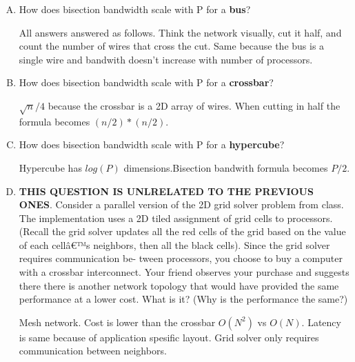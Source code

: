 \documentclass[11pt]{article}
\newenvironment{choice}{\begin{enumerate}[A.]}{\end{enumerate}}
\newenvironment{answer}{\begin{minipage}[c][1.5in]{\textwidth}}{\end{minipage}}
\begin{document}
\begin{choice}

\item How does bisection bandwidth scale with P for a \textbf{bus}?

\begin{answer}
All answers answered as follows. Think the network visually, cut it half,
and count the number of wires that cross the cut.\newline
Same because the bus is a single wire and bandwith doesn't increase with number of processors.
\end{answer}
\item How does bisection bandwidth scale with P for a \textbf{crossbar}?

\begin{answer}
$\sqrt{n}/4$ because the crossbar is a 2D array of wires. 
When cutting in half the formula becomes $(n/2) * (n/2)$.
\end{answer}
\item How does bisection bandwidth scale with P for a \textbf{hypercube}?

\begin{answer}
Hypercube has $log(P)$ dimensions.Bisection bandwith formula becomes $P/2$.
\end{answer}
\newpage 
\item \textbf{THIS QUESTION IS UNLRELATED TO THE PREVIOUS ONES}. Consider a parallel version of the 2D grid solver problem from class. The implementation uses a 2D tiled assignment of grid cells to processors. (Recall the grid solver updates all the red cells of the grid based on the value of each cellâ€™s neighbors, then all the black cells). Since the grid solver requires communication be- tween processors, you choose to buy a computer with a crossbar interconnect. Your friend observes your purchase and suggests there there is another network topology that would have provided the same performance at a lower cost. What is it? (Why is the performance the same?)

\begin{answer}
Mesh network. Cost is lower than the crossbar $O(N^2)$ vs $O(N)$.
Latency is same because of application spesific layout.
Grid solver only requires communication between neighbors.
\end{answer}
\end{choice}
\end{document}
